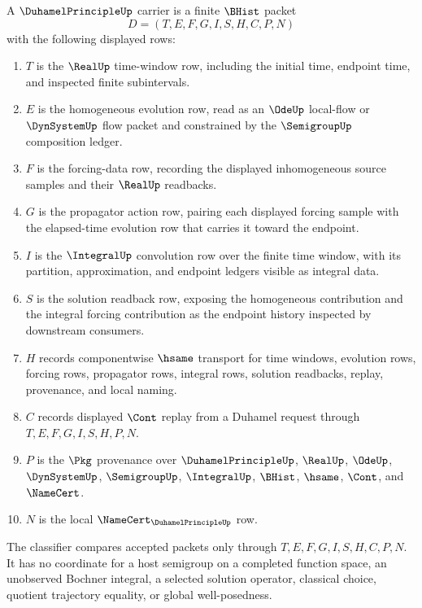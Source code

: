 \begin{definition}
\label{def:duhamel-principle-carrier}
A $\DuhamelPrincipleUp$ carrier is a finite $\BHist$ packet
$$
D=(T,E,F,G,I,S,H,C,P,N)
$$
with the following displayed rows:
\begin{enumerate}
\item $T$ is the $\RealUp$ time-window row, including the initial time, endpoint time, and inspected finite subintervals.
\item $E$ is the homogeneous evolution row, read as an $\OdeUp$ local-flow or $\DynSystemUp$ flow packet and constrained by the $\SemigroupUp$ composition ledger.
\item $F$ is the forcing-data row, recording the displayed inhomogeneous source samples and their $\RealUp$ readbacks.
\item $G$ is the propagator action row, pairing each displayed forcing sample with the elapsed-time evolution row that carries it toward the endpoint.
\item $I$ is the $\IntegralUp$ convolution row over the finite time window, with its partition, approximation, and endpoint ledgers visible as integral data.
\item $S$ is the solution readback row, exposing the homogeneous contribution and the integral forcing contribution as the endpoint history inspected by downstream consumers.
\item $H$ records componentwise $\hsame$ transport for time windows, evolution rows, forcing rows, propagator rows, integral rows, solution readbacks, replay, provenance, and local naming.
\item $C$ records displayed $\Cont$ replay from a Duhamel request through $T,E,F,G,I,S,H,P,N$.
\item $P$ is the $\Pkg$ provenance over $\DuhamelPrincipleUp$, $\RealUp$, $\OdeUp$, $\DynSystemUp$, $\SemigroupUp$, $\IntegralUp$, $\BHist$, $\hsame$, $\Cont$, and $\NameCert$.
\item $N$ is the local $\NameCert_{\DuhamelPrincipleUp}$ row.
\end{enumerate}
The classifier compares accepted packets only through $T,E,F,G,I,S,H,C,P,N$. It has no coordinate for a host semigroup on a completed function space, an unobserved Bochner integral, a selected solution operator, classical choice, quotient trajectory equality, or global well-posedness.
\end{definition}

